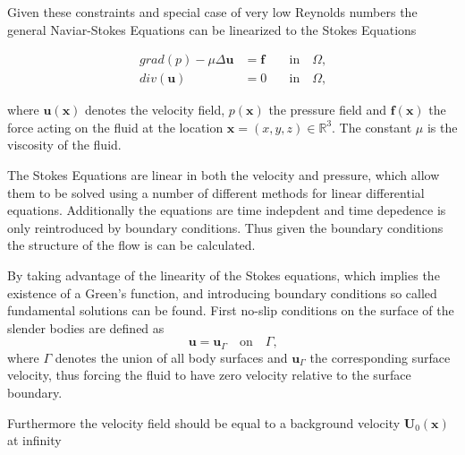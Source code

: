 \documentclass[a4paper,11pt]{kth-mag}
\begin{document}
Given these constraints and special case of very low Reynolds numbers the general Naviar-Stokes Equations can be linearized to the Stokes Equations

\begin{equation}
\label{eq:stokes_equations}
\begin{aligned}
    grad(p) - \mu \Delta \mathbf{u} &= \mathbf{f} \quad &\text{in} \quad \Omega \text{,}\\
    div(\mathbf{u}) &= 0 \quad &\text{in} \quad \Omega \text{,}
\end{aligned}
\end{equation}

where $\mathbf{u}(\mathbf{x})$ denotes the velocity field, $p(\mathbf{x})$ the pressure field and $\mathbf{f}(\mathbf{x})$ the force acting on the fluid at the location $\mathbf{x} = (x,y,z) \in \mathbb{R}^3$.
The constant $\mu$ is the viscosity of the fluid.

The Stokes Equations are linear in both the velocity and pressure, which allow them to be solved using a number of different methods for linear differential equations. Additionally the equations are time indepdent and time depedence is only reintroduced by boundary conditions. Thus given the boundary conditions the structure of the flow is can be calculated.

By taking advantage of the linearity of the Stokes equations, which implies the existence of a Green's function, and introducing boundary conditions so called fundamental solutions can be found. First no-slip conditions on the surface of the slender bodies are defined as
\begin{equation}
  \label{eq:boundary_condition_surface}
  \mathbf{u} = \mathbf{u}_\Gamma  \quad \text{on} \quad  \Gamma \text{,}
\end{equation}
where $\Gamma$ denotes the union of all body surfaces and $\mathbf{u}_\Gamma$ the corresponding surface velocity, thus forcing the fluid to have zero velocity relative to the surface boundary.

Furthermore the velocity field should be equal to a background velocity $\mathbf{U}_0(\mathbf{x})$ at infinity
\end{document}
